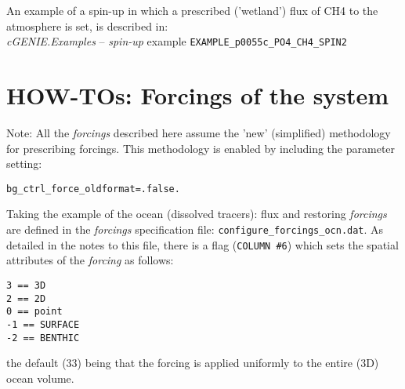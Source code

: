 \documentclass[10pt,twoside]{article}
\begin{document}
An example of a spin-up in which a prescribed ('wetland') flux of CH4 to the atmosphere is set, is described in:\\ \textit{cGENIE.Examples} -- \textit{spin-up} example \texttt{EXAMPLE\_p0055c\_PO4\_CH4\_SPIN2}



\newpage
\section{HOW-TOs: Forcings of the system}\label{how-to-5}

Note: All the \textit{forcings} described here assume the 'new' (simplified) methodology for prescribing forcings. This methodology is enabled by including the parameter setting:
\vspace{-10pt}\begin{verbatim}
bg_ctrl_force_oldformat=.false.
\end{verbatim}\vspace{-10pt}

Taking the example of the ocean (dissolved tracers): flux and restoring \textit{forcings} are defined in the \textit{forcings} specification file: \texttt{configure\_forcings\_ocn.dat}. As detailed in the notes to this file, there is a flag (\texttt{COLUMN \#6}) which sets the spatial attributes of the \textit{forcing} as follows: 
\vspace{-10pt}\begin{verbatim}
3 == 3D
2 == 2D
0 == point
-1 == SURFACE
-2 == BENTHIC
\end{verbatim}\vspace{-10pt}
the default (33) being that the forcing is applied uniformly to the entire (3D) ocean volume.
\end{document}
